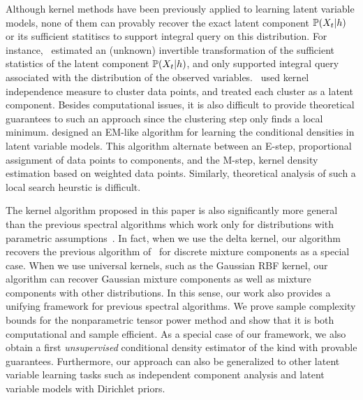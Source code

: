\documentclass{article}
\begin{document}
Although kernel methods have been previously applied to learning latent variable models, none of them can provably recover the exact latent component $\mathbb{P}(X_t|h)$ or its sufficient statitiscs to support integral query on this distribution. For instance, \citet{SonParXin11, SonDai13}~estimated an (unknown) invertible transformation of the sufficient statistics of the latent component $\mathbb{P}(X_t|h)$, and only supported integral query associated with the distribution of the observed variables. \citet{SgoJanPetSch13}~used kernel independence measure to cluster data points, and treated each cluster as a latent component. Besides computational issues, it is also difficult to provide theoretical guarantees to such an approach since the clustering step only finds a local minimum. \citet{BenChaHun09} designed an EM-like algorithm for learning the conditional densities in latent variable models. This algorithm alternate between an E-step, proportional assignment of data points to components, and the M-step, kernel density estimation based on weighted data points. Similarly, theoretical analysis of such a local search heurstic is difficult.

The kernel algorithm proposed in this paper is also significantly more general than the previous spectral algorithms which work only for distributions with parametric assumptions~\cite{AnandkumarEtal:tensor12,HsuKak13}. In fact, when we use the delta kernel, our algorithm recovers the previous algorithm of~\citet{AnandkumarEtal:tensor12} for discrete mixture components as a special case. When we use universal kernels, such as the Gaussian RBF kernel, our algorithm can recover Gaussian mixture components as well as mixture components with other distributions. In this sense, our work also provides a unifying framework for previous spectral algorithms. We prove sample complexity bounds for the nonparametric tensor power method and show that it is both computational and sample efficient. As a special case of our framework, we also obtain a first \emph{unsupervised} conditional density estimator of the kind with provable guarantees. Furthermore, our approach can also be generalized to other latent variable learning tasks such as independent component analysis and latent variable models with Dirichlet priors.
\end{document}
